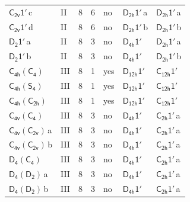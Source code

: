 \documentclass[10pt,a4paper]{article}
\numberwithin{equation}{section}
\newcommand{\grp}[1]{\mathsf{#1}}
\newcommand{\clsletter}[1]{\,{\scriptsize\color{black!55}#1}}
\begin{document}
{\begin{longtable}{@{}llrrlll@{}}
\href{C2v-1p.pdf}{$\grp{C_{2v}1'}$}\clsletter{c} & II & 8 & 6 & no & \href{D2h-1p.pdf}{$\grp{D_{2h}1'}$}\clsletter{a} & \href{D2h-1p.pdf}{$\grp{D_{2h}1'}$}\clsletter{a}\\
\href{C2v-1p.pdf}{$\grp{C_{2v}1'}$}\clsletter{d} & II & 8 & 6 & no & \href{D2h-1p.pdf}{$\grp{D_{2h}1'}$}\clsletter{b} & \href{D2h-1p.pdf}{$\grp{D_{2h}1'}$}\clsletter{b}\\
\href{D2-1p.pdf}{$\grp{D_{2}1'}$}\clsletter{a} & II & 8 & 3 & no & \href{D4h-1p.pdf}{$\grp{D_{4h}1'}$} & \href{D2h-1p.pdf}{$\grp{D_{2h}1'}$}\clsletter{a}\\
\href{D2-1p.pdf}{$\grp{D_{2}1'}$}\clsletter{b} & II & 8 & 3 & no & \href{D4h-1p.pdf}{$\grp{D_{4h}1'}$} & \href{D2h-1p.pdf}{$\grp{D_{2h}1'}$}\clsletter{b}\\
\href{C4h-C4.pdf}{$\grp{C_{4h}}(\grp{C_{4}})$} & III & 8 & 1 & yes & \href{D12h-1p.pdf}{$\grp{D_{12h}1'}$} & \href{C12h-1p.pdf}{$\grp{C_{12h}1'}$}\\
\href{C4h-S4.pdf}{$\grp{C_{4h}}(\grp{S_{4}})$} & III & 8 & 1 & yes & \href{D12h-1p.pdf}{$\grp{D_{12h}1'}$} & \href{C12h-1p.pdf}{$\grp{C_{12h}1'}$}\\
\href{C4h-C2h.pdf}{$\grp{C_{4h}}(\grp{C_{2h}})$} & III & 8 & 1 & yes & \href{D12h-1p.pdf}{$\grp{D_{12h}1'}$} & \href{C12h-1p.pdf}{$\grp{C_{12h}1'}$}\\
\href{C4v-C4.pdf}{$\grp{C_{4v}}(\grp{C_{4}})$} & III & 8 & 3 & no & \href{D4h-1p.pdf}{$\grp{D_{4h}1'}$} & \href{C2h-1p.pdf}{$\grp{C_{2h}1'}$}\clsletter{a}\\
\href{C4v-C2v.pdf}{$\grp{C_{4v}}(\grp{C_{2v}})$}\clsletter{a} & III & 8 & 3 & no & \href{D4h-1p.pdf}{$\grp{D_{4h}1'}$} & \href{C2h-1p.pdf}{$\grp{C_{2h}1'}$}\clsletter{a}\\
\href{C4v-C2v.pdf}{$\grp{C_{4v}}(\grp{C_{2v}})$}\clsletter{b} & III & 8 & 3 & no & \href{D4h-1p.pdf}{$\grp{D_{4h}1'}$} & \href{C2h-1p.pdf}{$\grp{C_{2h}1'}$}\clsletter{a}\\
\href{D4-C4.pdf}{$\grp{D_{4}}(\grp{C_{4}})$} & III & 8 & 3 & no & \href{D4h-1p.pdf}{$\grp{D_{4h}1'}$} & \href{C2h-1p.pdf}{$\grp{C_{2h}1'}$}\clsletter{a}\\
\href{D4-D2.pdf}{$\grp{D_{4}}(\grp{D_{2}})$}\clsletter{a} & III & 8 & 3 & no & \href{D4h-1p.pdf}{$\grp{D_{4h}1'}$} & \href{C2h-1p.pdf}{$\grp{C_{2h}1'}$}\clsletter{a}\\
\href{D4-D2.pdf}{$\grp{D_{4}}(\grp{D_{2}})$}\clsletter{b} & III & 8 & 3 & no & \href{D4h-1p.pdf}{$\grp{D_{4h}1'}$} & \href{C2h-1p.pdf}{$\grp{C_{2h}1'}$}\clsletter{a}\\

\end{longtable}}
\end{document}
